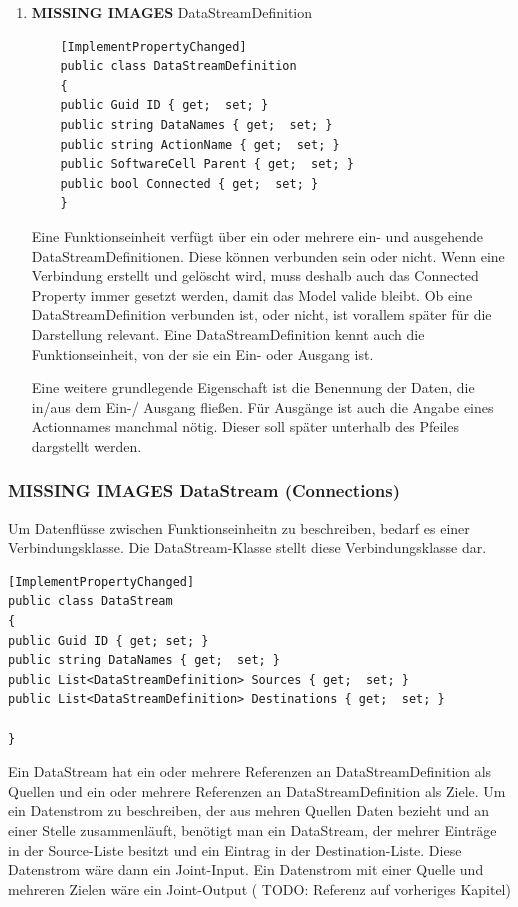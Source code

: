 \begin{enumerate}
	\item {\bfseries\sffamily MISSING IMAGES} DataStreamDefinition
	\label{sec:orgheadline7}
	
	\begin{verbatim}
	[ImplementPropertyChanged]
	public class DataStreamDefinition
	{
	public Guid ID { get;  set; }
	public string DataNames { get;  set; }
	public string ActionName { get;  set; }
	public SoftwareCell Parent { get;  set; }
	public bool Connected { get;  set; }
	}
	\end{verbatim}
	
	Eine Funktionseinheit verfügt über ein oder mehrere ein- und ausgehende
	DataStreamDefinitionen. Diese können verbunden sein oder nicht. Wenn eine
	Verbindung erstellt und gelöscht wird, muss deshalb auch das Connected
	Property immer gesetzt werden, damit das Model valide bleibt.
	Ob eine DataStreamDefinition verbunden ist, oder nicht, ist vorallem später
	für die Darstellung relevant.
	Eine DataStreamDefinition kennt auch die Funktionseinheit, von der sie ein
	Ein- oder Ausgang ist.
	
	Eine weitere grundlegende Eigenschaft ist die Benennung der Daten, die in/aus
	dem Ein-/ Ausgang fließen. Für Ausgänge ist auch die Angabe eines
	Actionnames manchmal nötig. Dieser soll später unterhalb des Pfeiles
	dargstellt werden.
\end{enumerate}

\subsubsection{{\bfseries\sffamily MISSING IMAGES} DataStream (Connections)}
\label{sec:orgheadline9}
Um Datenflüsse zwischen Funktionseinheitn zu beschreiben, bedarf es einer
Verbindungsklasse. Die DataStream-Klasse stellt diese Verbindungsklasse dar.


\begin{verbatim}
[ImplementPropertyChanged]
public class DataStream
{
public Guid ID { get; set; }
public string DataNames { get;  set; }
public List<DataStreamDefinition> Sources { get;  set; }
public List<DataStreamDefinition> Destinations { get;  set; }

}
\end{verbatim}

Ein DataStream hat ein oder mehrere Referenzen an DataStreamDefinition als
Quellen und ein oder mehrere Referenzen an DataStreamDefinition als Ziele.
Um ein Datenstrom zu beschreiben, der aus mehren Quellen Daten bezieht und
an einer Stelle zusammenläuft, benötigt man ein DataStream, der mehrer
Einträge in der Source-Liste besitzt und ein Eintrag in der
Destination-Liste. Diese Datenstrom wäre dann ein Joint-Input.
Ein Datenstrom mit einer Quelle und mehreren Zielen wäre ein Joint-Output ( TODO:
Referenz auf vorheriges Kapitel)

